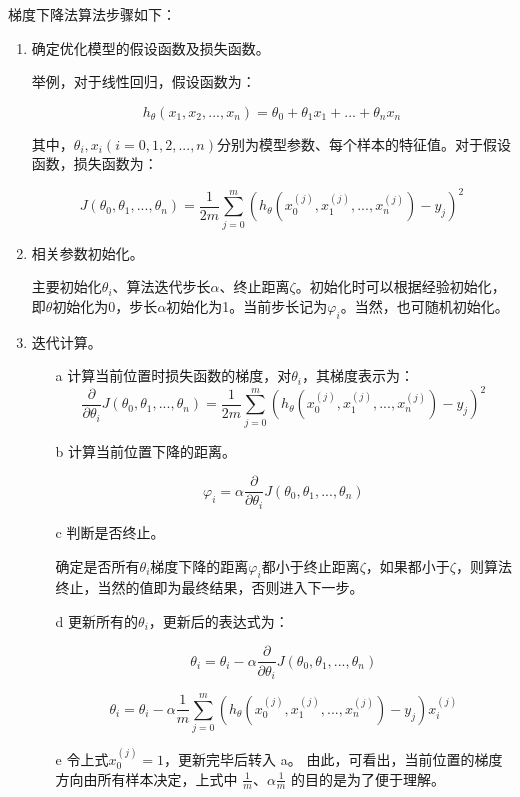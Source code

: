 梯度下降法算法步骤如下：

\begin{enumerate}
\itemsep0em 

\item 确定优化模型的假设函数及损失函数。

举例，对于线性回归，假设函数为：

$$
  h_\theta(x_1,x_2,...,x_n)=\theta_0+\theta_1x_1+...+\theta_nx_n
$$

  其中，$\theta_i,x_i(i=0,1,2,...,n)$分别为模型参数、每个样本的特征值。对于假设函数，损失函数为：

$$
  J(\theta_0,\theta_1,...,\theta_n)=\frac{1}{2m}\sum^{m}_{j=0}(h_\theta (x^{(j)}_0
  	,x^{(j)}_1,...,x^{(j)}_n)-y_j)^2
$$

\item 相关参数初始化。

	主要初始化${\theta}_i$、算法迭代步长${\alpha} $、终止距离${\zeta} $。初始化时可以根据经验初始化，即${\theta} $初始化为0，步长${\alpha} $初始化为1。当前步长记为${\varphi}_i $。当然，也可随机初始化。

\item 迭代计算。

	\begin{enumerate}
	\itemsep0em 
	\item[a] 计算当前位置时损失函数的梯度，对${\theta}_i $，其梯度表示为：
			$$
			\frac{\partial}{\partial \theta_i}J({\theta}_0,{\theta}_1,...,{\theta}_n)=\frac{1}{2m}\sum^{m}_{j=0}(h_\theta (x^{(j)}_0
				,x^{(j)}_1,...,x^{(j)}_n)-y_j)^2
			$$

		\item[b] 计算当前位置下降的距离。

			$$
			{\varphi}_i={\alpha} \frac{\partial}{\partial \theta_i}J({\theta}_0,{\theta}_1,...,{\theta}_n)
			$$

		\item[c] 判断是否终止。

			确定是否所有${\theta}_i$梯度下降的距离${\varphi}_i$都小于终止距离${\zeta}$，如果都小于${\zeta}$，则算法终止，当然的值即为最终结果，否则进入下一步。

		\item[d] 更新所有的${\theta}_i$，更新后的表达式为：

			$$
			{\theta}_i={\theta}_i-\alpha \frac{\partial}{\partial \theta_i}J({\theta}_0,{\theta}_1,...,{\theta}_n)
			$$

			$$
			\theta_i=\theta_i - \alpha \frac{1}{m} \sum^{m}_{j=0}(h_\theta (x^{(j)}_0
				,x^{(j)}_1,...,x^{(j)}_n)-y_j)x^{(j)}_i
			$$

		\item[e] 令上式$x^{(j)}_0=1$，更新完毕后转入 a。
		由此，可看出，当前位置的梯度方向由所有样本决定，上式中 $\frac{1}{m}$、$\alpha \frac{1}{m}$ 的目的是为了便于理解。
	\end{enumerate}
\end{enumerate}

